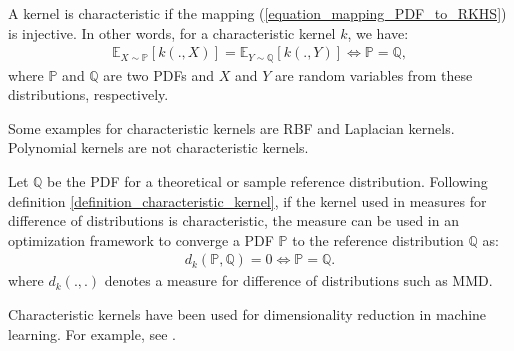 \documentclass[lang=cn,10pt]{gorgeousnbook}
\numberwithin{equation}{section}%
\numberwithin{figure}{section}%
\begin{document}
\begin{definition}\label{definition_characteristic_kernel}
A kernel is characteristic if the mapping (\ref{equation_mapping_PDF_to_RKHS}) is injective. In other words, for a characteristic kernel $k$, we have:
\begin{align}
\mathbb{E}_{X \sim \mathbb{P}}[k(., X)] = \mathbb{E}_{Y \sim \mathbb{Q}}[k(., Y)] \iff \mathbb{P} = \mathbb{Q},
\end{align}
where $\mathbb{P}$ and $\mathbb{Q}$ are two PDFs and $X$ and $Y$ are random variables from these distributions, respectively. 
\end{definition}
Some examples for characteristic kernels are RBF and Laplacian kernels. Polynomial kernels are not characteristic kernels. %

\begin{corollary}\label{corollary_characteristic_kernel_convergence_of_distributions}
Let $\mathbb{Q}$ be the PDF for a theoretical or sample reference distribution. Following definition \ref{definition_characteristic_kernel}, if the kernel used in measures for difference of distributions is characteristic, the measure can be used in an optimization framework to converge a PDF $\mathbb{P}$ to the reference distribution $\mathbb{Q}$ as:
\begin{align}
d_k(\mathbb{P}, \mathbb{Q}) = 0 \iff \mathbb{P} = \mathbb{Q}.
\end{align}
where $d_k(.,.)$ denotes a measure for difference of distributions such as MMD. 
\end{corollary}

Characteristic kernels have been used for dimensionality reduction in machine learning. For example, see \cite{fukumizu2004dimensionality,fukumizu2009kernel}.
\end{document}
